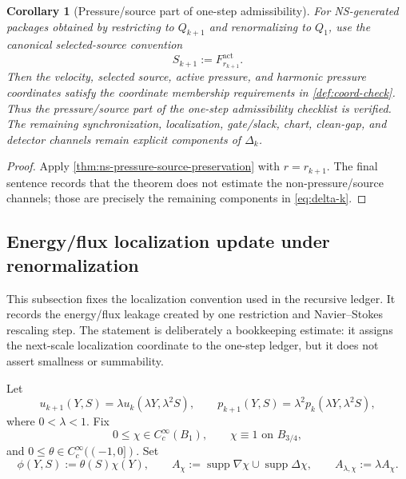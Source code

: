 \documentclass[11pt]{article}
\numberwithin{equation}{section}
\theoremstyle{plain}
\newtheorem{corollary}[theorem]{Corollary}
\theoremstyle{definition}
\theoremstyle{remark}
\newcommand{\supp}{\operatorname{supp}}
\begin{document}
\begin{corollary}[Pressure/source part of one-step admissibility]\label{cor:pressure-source-one-step}
For NS-generated packages obtained by restricting to \(Q_{k+1}\) and
renormalizing to \(Q_1\), use the canonical selected-source convention
\[
  S_{k+1}:=F_{r_{k+1}}^{\mathrm{act}}.
\]
Then the velocity, selected source, active pressure, and harmonic pressure
coordinates satisfy the coordinate membership requirements in
\cref{def:coord-check}.  Thus the pressure/source part of the one-step
admissibility checklist is verified.  The remaining synchronization,
localization, gate/slack, chart, clean-gap, and detector channels remain
explicit components of \(\Delta_k\).
\end{corollary}

\begin{proof}
Apply \cref{thm:ns-pressure-source-preservation} with
\(r=r_{k+1}\).  The final sentence records that the theorem does not estimate
the non-pressure/source channels; those are precisely the remaining
components in \eqref{eq:delta-k}.
\end{proof}

\subsection{Energy/flux localization update under renormalization}

This subsection fixes the localization convention used in the recursive
ledger.  It records the energy/flux leakage created by one restriction and
Navier--Stokes rescaling step.  The statement is deliberately a bookkeeping
estimate: it assigns the next-scale localization coordinate to the one-step
ledger, but it does not assert smallness or summability.

Let
\[
  u_{k+1}(Y,S)=\lambda u_k(\lambda Y,\lambda^2S),
  \qquad
  p_{k+1}(Y,S)=\lambda^2p_k(\lambda Y,\lambda^2S),
\]
where \(0<\lambda<1\).  Fix
\[
  0\le\chi\in C_c^\infty(B_1),
  \qquad
  \chi\equiv1\text{ on }B_{3/4},
\]
and \(0\le\theta\in C_c^\infty((-1,0])\).  Set
\[
  \phi(Y,S):=\theta(S)\chi(Y),
  \qquad
  A_\chi:=\supp\nabla\chi\cup\supp\Delta\chi,
  \qquad
  A_{\lambda,\chi}:=\lambda A_\chi.
\]
\end{document}
